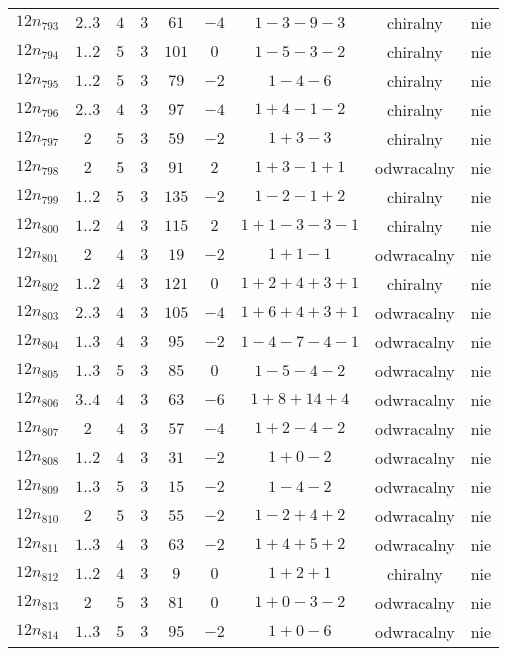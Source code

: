 \begin{longtable}{ccccccccc}
$12n_{793}$ & $2..3$ & $4$ & $3$ & $61$ & $-4$ & $1-3-9-3$ & chiralny & nie \\
$12n_{794}$ & $1..2$ & $5$ & $3$ & $101$ & $0$ & $1-5-3-2$ & chiralny & nie \\
$12n_{795}$ & $1..2$ & $5$ & $3$ & $79$ & $-2$ & $1-4-6$ & chiralny & nie \\
$12n_{796}$ & $2..3$ & $4$ & $3$ & $97$ & $-4$ & $1+4-1-2$ & chiralny & nie \\
$12n_{797}$ & $2$ & $5$ & $3$ & $59$ & $-2$ & $1+3-3$ & chiralny & nie \\
$12n_{798}$ & $2$ & $5$ & $3$ & $91$ & $2$ & $1+3-1+1$ & odwracalny & nie \\
$12n_{799}$ & $1..2$ & $5$ & $3$ & $135$ & $-2$ & $1-2-1+2$ & chiralny & nie \\
$12n_{800}$ & $1..2$ & $4$ & $3$ & $115$ & $2$ & $1+1-3-3-1$ & chiralny & nie \\
$12n_{801}$ & $2$ & $4$ & $3$ & $19$ & $-2$ & $1+1-1$ & odwracalny & nie \\
$12n_{802}$ & $1..2$ & $4$ & $3$ & $121$ & $0$ & $1+2+4+3+1$ & chiralny & nie \\
$12n_{803}$ & $2..3$ & $4$ & $3$ & $105$ & $-4$ & $1+6+4+3+1$ & odwracalny & nie \\
$12n_{804}$ & $1..3$ & $4$ & $3$ & $95$ & $-2$ & $1-4-7-4-1$ & odwracalny & nie \\
$12n_{805}$ & $1..3$ & $5$ & $3$ & $85$ & $0$ & $1-5-4-2$ & odwracalny & nie \\
$12n_{806}$ & $3..4$ & $4$ & $3$ & $63$ & $-6$ & $1+8+14+4$ & odwracalny & nie \\
$12n_{807}$ & $2$ & $4$ & $3$ & $57$ & $-4$ & $1+2-4-2$ & odwracalny & nie \\
$12n_{808}$ & $1..2$ & $4$ & $3$ & $31$ & $-2$ & $1+0-2$ & odwracalny & nie \\
$12n_{809}$ & $1..3$ & $5$ & $3$ & $15$ & $-2$ & $1-4-2$ & odwracalny & nie \\
$12n_{810}$ & $2$ & $5$ & $3$ & $55$ & $-2$ & $1-2+4+2$ & odwracalny & nie \\
$12n_{811}$ & $1..3$ & $4$ & $3$ & $63$ & $-2$ & $1+4+5+2$ & odwracalny & nie \\
$12n_{812}$ & $1..2$ & $4$ & $3$ & $9$ & $0$ & $1+2+1$ & chiralny & nie \\
$12n_{813}$ & $2$ & $5$ & $3$ & $81$ & $0$ & $1+0-3-2$ & odwracalny & nie \\
$12n_{814}$ & $1..3$ & $5$ & $3$ & $95$ & $-2$ & $1+0-6$ & odwracalny & nie \\

\end{longtable}
